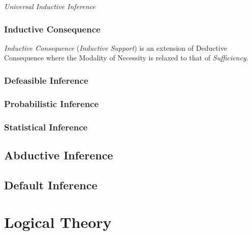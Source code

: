 \emph{Universal Inductive Inference}



\subsubsection{Inductive Consequence}\label{sec:inductive_consequence}

\emph{Inductive Consequence} (\emph{Inductive Support}) is an
extension of Deductive Consequence where the Modality of Necessity is
relaxed to that of \emph{Sufficiency}.



\subsubsection{Defeasible Inference}\label{sec:defeasible_inference}

\subsubsection{Probabilistic Inference}\label{sec:probabilistic_inference}

\subsubsection{Statistical Inference}\label{sec:statistical_inference}



\subsection{Abductive Inference}\label{sec:abductive_inference}



\subsection{Default Inference}\label{sec:default_inference}



\section{Logical Theory}\label{sec:logical_theory}


